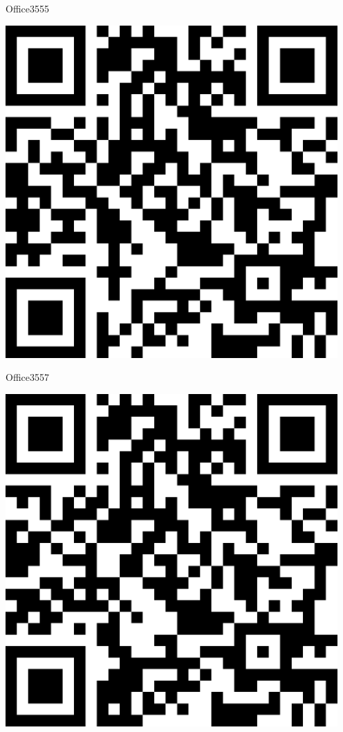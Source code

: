 \documentclass[letterpaper]{article}
\begin{document}
 \hfill{\small Office3555} 

 \vspace{1in} 
 \pagebreak 
{} 
 \vspace*{\fill} 
 \begingroup 
 \centerline{\includegraphics[scale=1,width=5in,height=5in]{Office3557.png}} 
 \endgroup 
 \vspace*{\fill} 

 \hfill{\small Office3557} 

 \vspace{1in} 
 \pagebreak 
{} 
 \vspace*{\fill} 
 \begingroup 
 \centerline{\includegraphics[scale=1,width=5in,height=5in]{Office3559.png}} 
 \endgroup 
 \vspace*{\fill} 
\end{document}
